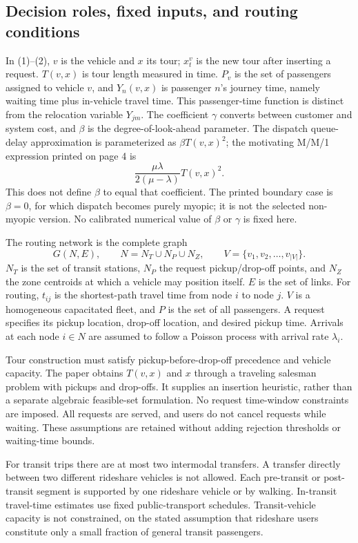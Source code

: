 \documentclass{article}
\begin{document}
\subsection*{Decision roles, fixed inputs, and routing conditions}
In (1)--(2), $v$ is the vehicle and $x$ its tour; $x_t^v$ is the new tour after inserting a request. $T(v,x)$ is tour length measured in time. $P_v$ is the set of passengers assigned to vehicle $v$, and $Y_n(v,x)$ is passenger $n$'s journey time, namely waiting time plus in-vehicle travel time. This passenger-time function is distinct from the relocation variable $Y_{jm}$. The coefficient $\gamma$ converts between customer and system cost, and $\beta$ is the degree-of-look-ahead parameter. The dispatch queue-delay approximation is parameterized as $\beta T(v,x)^2$; the motivating M/M/1 expression printed on page 4 is
\[
\frac{\mu\lambda}{2(\mu-\lambda)}T(v,x)^2.
\]
This does not define $\beta$ to equal that coefficient. The printed boundary case is $\beta=0$, for which dispatch becomes purely myopic; it is not the selected non-myopic version. No calibrated numerical value of $\beta$ or $\gamma$ is fixed here.

The routing network is the complete graph
\[
G(N,E),\qquad N=N_T\cup N_P\cup N_Z,
\qquad V=\{v_1,v_2,\ldots,v_{|V|}\}.
\]
$N_T$ is the set of transit stations, $N_P$ the request pickup/drop-off points, and $N_Z$ the zone centroids at which a vehicle may position itself. $E$ is the set of links. For routing, $t_{ij}$ is the shortest-path travel time from node $i$ to node $j$. $V$ is a homogeneous capacitated fleet, and $P$ is the set of all passengers. A request specifies its pickup location, drop-off location, and desired pickup time. Arrivals at each node $i\in N$ are assumed to follow a Poisson process with arrival rate $\lambda_i$.

Tour construction must satisfy pickup-before-drop-off precedence and vehicle capacity. The paper obtains $T(v,x)$ and $x$ through a traveling salesman problem with pickups and drop-offs. It supplies an insertion heuristic, rather than a separate algebraic feasible-set formulation. No request time-window constraints are imposed. All requests are served, and users do not cancel requests while waiting. These assumptions are retained without adding rejection thresholds or waiting-time bounds.

For transit trips there are at most two intermodal transfers. A transfer directly between two different rideshare vehicles is not allowed. Each pre-transit or post-transit segment is supported by one rideshare vehicle or by walking. In-transit travel-time estimates use fixed public-transport schedules. Transit-vehicle capacity is not constrained, on the stated assumption that rideshare users constitute only a small fraction of general transit passengers.
\end{document}
